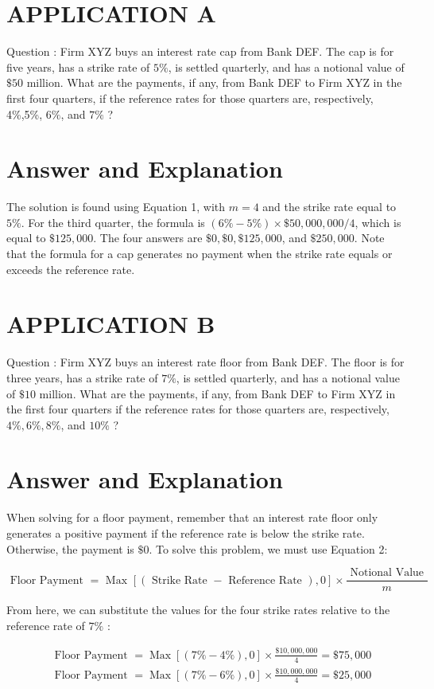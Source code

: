 \documentclass[11pt]{article}
\begin{document}
\section*{APPLICATION A}
Question : Firm XYZ buys an interest rate cap from Bank DEF. The cap is for five years, has a strike rate of $5 \%$, is settled quarterly, and has a notional value of $\$ 50$ million. What are the payments, if any, from Bank DEF to Firm XYZ in the first four quarters, if the reference rates for those quarters are, respectively, 4\%,5\%, $6 \%$, and $7 \%$ ?

\section*{Answer and Explanation}
The solution is found using Equation 1, with $m=4$ and the strike rate equal to $5 \%$. For the third quarter, the formula is $(6 \%-5 \%) \times \$ 50,000,000 / 4$, which is equal to $\$ 125,000$. The four answers are $\$ 0, \$ 0, \$ 125,000$, and $\$ 250,000$. Note that the formula for a cap generates no payment when the strike rate equals or exceeds the reference rate.

\section*{APPLICATION B}
Question : Firm XYZ buys an interest rate floor from Bank DEF. The floor is for three years, has a strike rate of $7 \%$, is settled quarterly, and has a notional value of $\$ 10$ million. What are the payments, if any, from Bank DEF to Firm XYZ in the first four quarters if the reference rates for those quarters are, respectively, $4 \%, 6 \%, 8 \%$, and $10 \%$ ?

\section*{Answer and Explanation}
When solving for a floor payment, remember that an interest rate floor only generates a positive payment if the reference rate is below the strike rate. Otherwise, the payment is $\$ 0$. To solve this problem, we must use Equation 2:

$$
\text { Floor Payment }=\text { Max }[(\text { Strike Rate }- \text { Reference Rate }), 0] \times \frac{\text { Notional Value }}{m}
$$

From here, we can substitute the values for the four strike rates relative to the reference rate of $7 \%$ :

$$
\begin{aligned}
& \text { Floor Payment }=\operatorname{Max}[(7 \%-4 \%), 0] \times \frac{\$ 10,000,000}{4}=\$ 75,000 \\
& \text { Floor Payment }=\operatorname{Max}[(7 \%-6 \%), 0] \times \frac{\$ 10,000,000}{4}=\$ 25,000
\end{aligned}
$$
\end{document}
